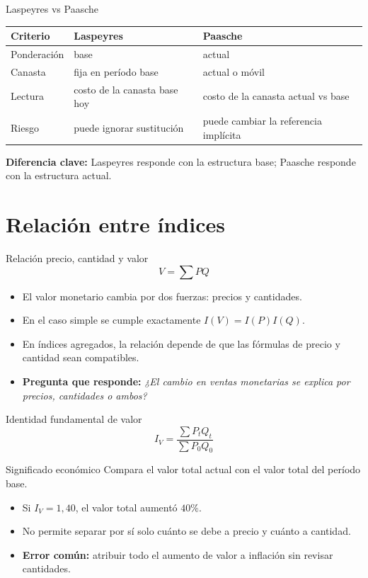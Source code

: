 \documentclass[aspectratio=169,11pt]{beamer}
\newcommand{\pregunta}[1]{\textbf{Pregunta que responde:} \emph{#1}}
\newcommand{\errorcomun}[1]{\textbf{Error común:} #1}
\newcommand{\diferencia}[1]{\textbf{Diferencia clave:} #1}
\begin{document}
\begin{frame}{Laspeyres vs Paasche}
\small
\begin{center}
\begin{tabular}{p{}p{}p{}}
\toprule
Criterio & Laspeyres & Paasche \\
\midrule
Ponderación & base & actual \\
Canasta & fija en período base & actual o móvil \\
Lectura & costo de la canasta base hoy & costo de la canasta actual vs base \\
Riesgo & puede ignorar sustitución & puede cambiar la referencia implícita \\
\bottomrule
\end{tabular}
\end{center}
\diferencia{Laspeyres responde con la estructura base; Paasche responde con la estructura actual.}
\end{frame}

\section{Relación entre índices}

\begin{frame}{Relación precio, cantidad y valor}
\[
V=\sum PQ
\]
\begin{itemize}
  \item El valor monetario cambia por dos fuerzas: precios y cantidades.
  \item En el caso simple se cumple exactamente $I(V)=I(P)I(Q)$.
  \item En índices agregados, la relación depende de que las fórmulas de precio y cantidad sean compatibles.
  \item \pregunta{¿El cambio en ventas monetarias se explica por precios, cantidades o ambos?}
\end{itemize}
\end{frame}

\begin{frame}{Identidad fundamental de valor}
\[
I_V=\frac{\sum P_tQ_t}{\sum P_0Q_0}
\]
\begin{block}{Significado económico}
Compara el valor total actual con el valor total del período base.
\end{block}
\begin{itemize}
  \item Si $I_V=1{,}40$, el valor total aumentó $40\%$.
  \item No permite separar por sí solo cuánto se debe a precio y cuánto a cantidad.
  \item \errorcomun{atribuir todo el aumento de valor a inflación sin revisar cantidades.}
\end{itemize}
\end{frame}
\end{document}
